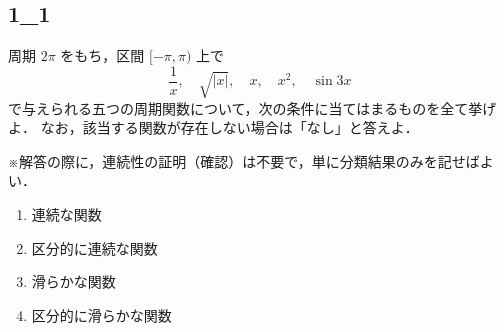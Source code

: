 \subsection{1_1}
\begin{exercise}
	周期 \(2\pi\) をもち，区間 \([-\pi,\pi)\) 上で
	\[
	\frac{1}{x},\quad \sqrt{|x|},\quad x,\quad x^2,\quad \sin 3x
	\]
	で与えられる五つの周期関数について，次の条件に当てはまるものを全て挙げよ．
	なお，該当する関数が存在しない場合は「なし」と答えよ．
	
	\medskip
	
	※解答の際に，連続性の証明（確認）は不要で，単に分類結果のみを記せばよい．
	
	\begin{enumerate}
		\item 連続な関数
		\item 区分的に連続な関数
		\item 滑らかな関数
		\item 区分的に滑らかな関数
	\end{enumerate}
\end{exercise}
